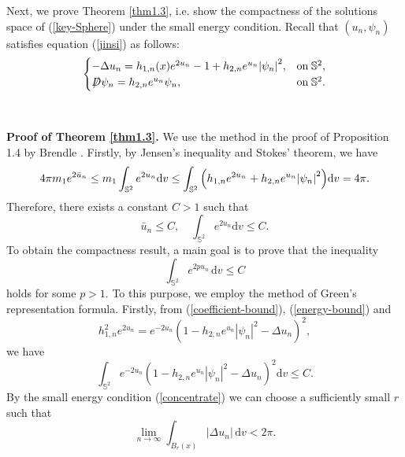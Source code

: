 \documentclass[a4paper, 12pt]{article}
\def\slashiii#1{\setbox0=\hbox{$#1$}#1\hskip-\wd0\hbox to\wd0{\hss\sl/\/\hss}}
\begin{document}
Next, we prove Theorem \ref{thm1.3}, i.e. show the compactness of the solutions space of (\ref{key-Sphere}) under the small energy  condition.  Recall that $(u_n,\psi_n)$  satisfies equation (\ref{jinsi}) as  follows:
\begin{equation*}
	\begin{cases}
		{ - \Delta u_n = {h_{1,n}}(x){e^{2u_n}} - 1 + {h_{2,n}}{e^{u_n }}{{\left| \psi_n   \right|}^2},}&{{\text{on}}\;{\mathbb{S}^2},} \\
		{\slashiii{D}\psi_n   ={h_{2,n}} {e^{u_n}}\psi_n  ,}&{{\text{on}}\;{\mathbb{S}^2}.}
	\end{cases}
\end{equation*}

\

\noindent\textbf{Proof of Theorem \ref{thm1.3}.} We use the method in the proof of Proposition 1.4 by Brendle \cite{MR1999924}.
Firstly, by Jensen's inequality and Stokes' theorem, we have
\[
4\pi m_1{e^{2{{\bar u}_n}}} \leq m_1\int_{{\mathbb{S}^2}} {{e^{2{u_n}}}} {\text{d}{v}} \leq \int_{{\mathbb{S}^2}} {\left( {{h_{1,n}}{e^{2{u_n}}}{\mkern 1mu}  + {h_{2,n}}{e^{{u_n}}}{{\left| {{\psi _n}} \right|}^2}} \right)} {\text{d}{v}} = 4\pi   .
\]
Therefore, there exists a constant $C>1$ such that
\begin{equation}\label{energy-bound}
	{{\bar u}_n} \leq {C},\quad \int_{{\mathbb{S}^2}} {{e^{2{u_n}}}} {\text{d}{v}} \leq {C}.
\end{equation}
To obtain the compactness result, a main goal is to prove that the inequality \begin{equation}\label{int_finit}
	\int_{\mathbb{S}^2} e^{2 p u_n} \, {\text{d}{v}} \leq C
\end{equation} holds for  some \( p > 1 \). To this purpose, we employ the method of Green's representation  formula. Firstly, from (\ref{coefficient-bound}), (\ref{energy-bound}) and
$$
{h^2_{1,n}}{e^{2{u_n}}} = {e^{ - 2{u_n}}}{\left( 1 - {h_{2,n}}{e^{{u_n}}}{\left| {{\psi _n}} \right|^2} - \Delta {u_n}\right) ^2},
$$
we have
\begin{equation}\label{weishi}
	\int_{\mathbb{S}^2} e^{-2u_n} \left( 1-{h_{2,n}}{e^{u_n}}{\left| \psi_n  \right|^2} -\Delta u_n\right) ^2  {\text{d}{v}} \leq C.
\end{equation}	
By the small energy condition (\ref{concentrate}) we can choose a sufficiently small \( r \) such that
\begin{equation}\label{local-limit}
	\lim_{n \to \infty} \int_{B_r(x)} |\Delta u_n| \, {\text{d}{v}} < 2\pi.
\end{equation}
\end{document}
